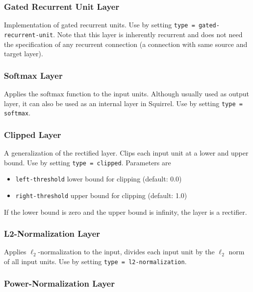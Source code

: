 \subsubsection*{Gated Recurrent Unit Layer}

Implementation of gated recurrent units. Use by setting \texttt{type = gated-recurrent-unit}. Note that this layer is inherently recurrent and does not need the specification of any recurrent connection (\ie a connection with same source and target layer).

\subsubsection*{Softmax Layer}

Applies the $ \mathrm{softmax} $ function to the input units. Although usually used as output layer, it can also be used as an internal layer in Squirrel. Use by setting \texttt{type = softmax}.

\subsubsection*{Clipped Layer}

A generalization of the rectified layer. Clips each input unit at a lower and upper bound. Use by setting \texttt{type = clipped}. Parameters are
\begin{itemize}
    \item \texttt{left-threshold} lower bound for clipping (default: 0.0)
    \item \texttt{right-threshold} upper bound for clipping (default: 1.0)
\end{itemize}
If the lower bound is zero and the upper bound is infinity, the layer is a rectifier.

\subsubsection*{L2-Normalization Layer}

Applies $ \ell_2 $-normalization to the input, \ie divides each input unit by the $ \ell_2 $ norm of all input units. Use by setting \texttt{type = l2-normalization}.

\subsubsection*{Power-Normalization Layer}

